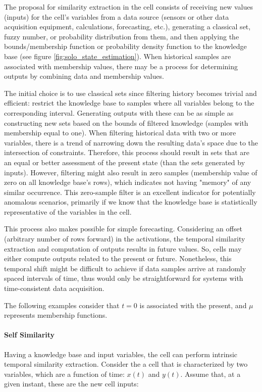 The proposal for similarity extraction in the cell consists of receiving new values (inputs) for the cell's variables from a data source (sensors or other data acquisition equipment, calculations, forecasting, etc.), generating a classical set, fuzzy number, or probability distribution from them, and then applying the bounds/membership function or probability density function to the knowledge base (see figure \ref{fig:solo_state_estimation}). When historical samples are associated with membership values, there may be a process for determining outputs by combining data and membership values.

The initial choice is to use classical sets since filtering history becomes trivial and efficient: restrict the knowledge base to samples where all variables belong to the corresponding interval. Generating outputs with these can be as simple as constructing new sets based on the bounds of filtered knowledge (samples with membership equal to one). When filtering historical data with two or more variables, there is a trend of narrowing down the resulting data's space due to the intersection of constraints. Therefore, this process should result in sets that are an equal or better assessment of the present state (than the sets generated by inputs). However, filtering might also result in zero samples (membership value of zero on all knowledge base's rows), which indicates not having "memory" of any similar occurrence. This zero-sample filter is an excellent indicator for potentially anomalous scenarios, primarily if we know that the knowledge base is statistically representative of the variables in the cell.

This process also makes possible for simple forecasting. Considering an offset (arbitrary number of rows forward) in the activations, the temporal similarity extraction and computation of outputs results in future values. So, cells may either compute outputs related to the present or future. Nonetheless, this temporal shift might be difficult to achieve if data samples arrive at randomly spaced intervals of time, thus would only be straightforward for systems with time-consistent data acquisition.

The following examples consider that $t=0$ is associated with the present, and $\mu$ represents membership functions.

\paragraph{Self Similarity}
Having a knowledge base and input variables, the cell can perform intrinsic temporal similarity extraction.
Consider the a cell that is characterized by two variables, which are a function of time: $x(t)$ and $y(t)$.
Assume that, at a given instant, these are the new cell inputs:

